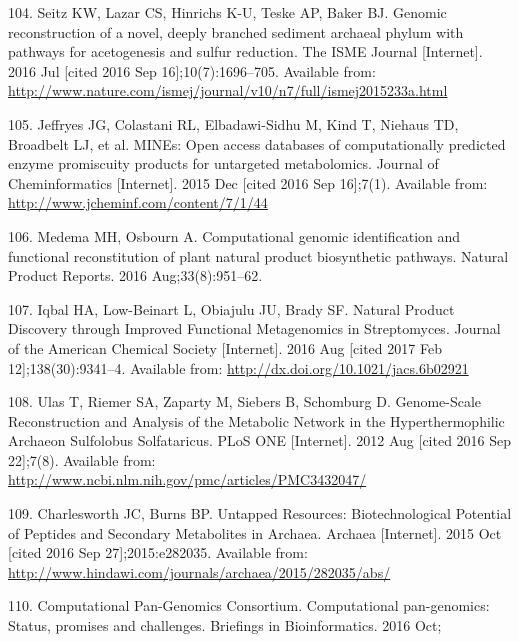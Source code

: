 \documentclass[12pt,twoside]{reedthesis}
\begin{document}
  \hypertarget{ref-seitz_genomic_2016}{}
  104. Seitz KW, Lazar CS, Hinrichs K-U, Teske AP, Baker BJ. Genomic
  reconstruction of a novel, deeply branched sediment archaeal phylum with
  pathways for acetogenesis and sulfur reduction. The ISME Journal
  {[}Internet{]}. 2016 Jul {[}cited 2016 Sep 16{]};10(7):1696--705.
  Available from:
  \url{http://www.nature.com/ismej/journal/v10/n7/full/ismej2015233a.html}
  
  \hypertarget{ref-jeffryes_mines_2015}{}
  105. Jeffryes JG, Colastani RL, Elbadawi-Sidhu M, Kind T, Niehaus TD,
  Broadbelt LJ, et al. MINEs: Open access databases of computationally
  predicted enzyme promiscuity products for untargeted metabolomics.
  Journal of Cheminformatics {[}Internet{]}. 2015 Dec {[}cited 2016 Sep
  16{]};7(1). Available from: \url{http://www.jcheminf.com/content/7/1/44}
  
  \hypertarget{ref-medema_computational_2016}{}
  106. Medema MH, Osbourn A. Computational genomic identification and
  functional reconstitution of plant natural product biosynthetic
  pathways. Natural Product Reports. 2016 Aug;33(8):951--62.
  
  \hypertarget{ref-iqbal_natural_2016}{}
  107. Iqbal HA, Low-Beinart L, Obiajulu JU, Brady SF. Natural Product
  Discovery through Improved Functional Metagenomics in Streptomyces.
  Journal of the American Chemical Society {[}Internet{]}. 2016 Aug
  {[}cited 2017 Feb 12{]};138(30):9341--4. Available from:
  \url{http://dx.doi.org/10.1021/jacs.6b02921}
  
  \hypertarget{ref-ulas_genome-scale_2012}{}
  108. Ulas T, Riemer SA, Zaparty M, Siebers B, Schomburg D. Genome-Scale
  Reconstruction and Analysis of the Metabolic Network in the
  Hyperthermophilic Archaeon Sulfolobus Solfataricus. PLoS ONE
  {[}Internet{]}. 2012 Aug {[}cited 2016 Sep 22{]};7(8). Available from:
  \url{http://www.ncbi.nlm.nih.gov/pmc/articles/PMC3432047/}
  
  \hypertarget{ref-charlesworth_untapped_2015}{}
  109. Charlesworth JC, Burns BP. Untapped Resources: Biotechnological
  Potential of Peptides and Secondary Metabolites in Archaea. Archaea
  {[}Internet{]}. 2015 Oct {[}cited 2016 Sep 27{]};2015:e282035. Available
  from: \url{http://www.hindawi.com/journals/archaea/2015/282035/abs/}
  
  \hypertarget{ref-computational_pan-genomics_consortium_computational_2016}{}
  110. Computational Pan-Genomics Consortium. Computational pan-genomics:
  Status, promises and challenges. Briefings in Bioinformatics. 2016 Oct;
  
\end{document}
